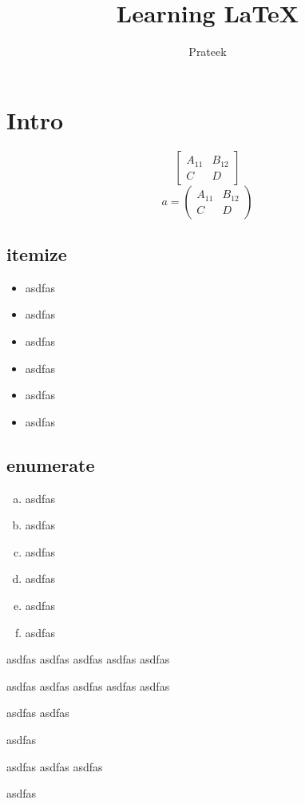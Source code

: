 \documentclass[a4paper,12pt]{book}%
\title{Learning \LaTeX}
\author{Prateek}
\begin{document}
\maketitle
\tableofcontents
\listoffigures
\listoftables

\chapter{Intro}
$$
\begin{bmatrix}
A_{11}&B_{12}\\
C&D
\end{bmatrix}
$$
$$
a=\begin{pmatrix}
A_{11}&B_{12}\\
C&D
\end{pmatrix}
$$

\section{itemize}

\begin{itemize}
\item asdfas
\item asdfas
\item asdfas
\item asdfas
\item asdfas
\item asdfas
\end{itemize}


\section{enumerate}
\begin{enumerate}[a)]%
\item asdfas
\item asdfas
\item asdfas
\item asdfas
\item asdfas
\item asdfas
\end{enumerate}

\begin{description}
\item[Force] asdfas asdfas asdfas asdfas asdfas 
\item[$\alpha$] asdfas asdfas asdfas asdfas asdfas
\item asdfas asdfas
\item asdfas
\item asdfas asdfas asdfas
\item asdfas
\end{description}
\end{document}

